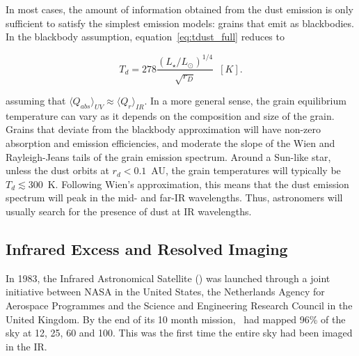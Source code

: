     In most cases, the amount of information obtained from the dust emission is only sufficient to satisfy the simplest emission models: grains that emit as blackbodies. In the blackbody assumption, equation~\ref{eq:tdust_full} reduces to 
            
    \begin{equation}\label{eq:blackbody_temp}
            T_d = 278 \frac{\left(L_\star/L_\odot \right)^{1/4}}{\sqrt{r_D}}\enspace [K]. 
    \end{equation}
    
    \noindent assuming that $\langle Q_{abs} \rangle_{UV} \approx \langle Q_{r}\rangle_{IR}$. In a more general sense, the grain equilibrium temperature can vary as it depends on the composition and size of the grain\citep{Draine2003}. Grains that deviate from the blackbody approximation will have non-zero absorption and emission efficiencies, and moderate the slope of the Wien and Rayleigh-Jeans tails of the grain emission spectrum. Around a Sun-like star, unless the dust orbits at $r_d<0.1$~AU, the grain temperatures will typically be $T_d \lesssim 300$~K. Following Wien's approximation, this means that the dust emission spectrum will peak in the mid- and far-IR wavelengths. Thus, astronomers will usually search for the presence of dust at IR wavelengths. 

    \subsection{Infrared Excess and Resolved Imaging}\label{sec:excess_resolvedimaging}

    In 1983, the Infrared Astronomical Satellite (\iras) was launched through a joint initiative between NASA in the United States, the Netherlands Agency for Aerospace Programmes and the Science and Engineering Research Council in the United Kingdom. By the end of its 10 month mission, \iras\ had mapped 96\% of the sky at 12, 25, 60 and 100\micron. This was the first time the entire sky had been imaged in the IR. 
    
